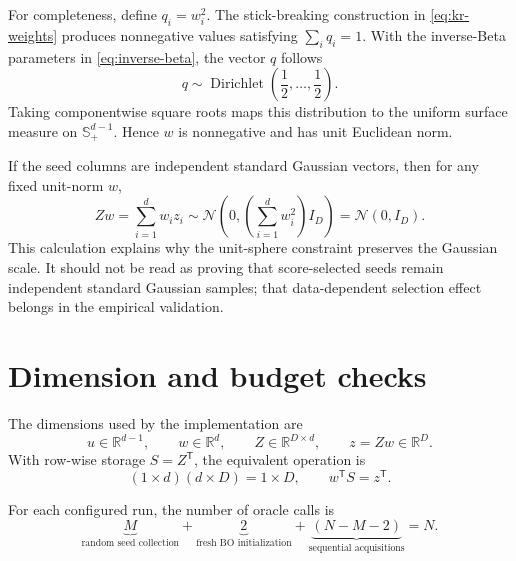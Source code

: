 \documentclass[11pt]{article}
\newcommand{\R}{\mathbb{R}}
\newcommand{\sphere}{\mathbb{S}}
\begin{document}
For completeness, define \(q_i=w_i^2\).  The stick-breaking construction in
\eqref{eq:kr-weights} produces nonnegative values satisfying
\(\sum_iq_i=1\).  With the inverse-Beta parameters in
\eqref{eq:inverse-beta}, the vector \(q\) follows
\begin{equation}
    q\sim\operatorname{Dirichlet}\!\left(\frac12,\ldots,\frac12\right).
    \label{eq:dirichlet-squared-weights}
\end{equation}
Taking componentwise square roots maps this distribution to the uniform
surface measure on \(\sphere^{d-1}_{+}\).  Hence \(w\) is nonnegative and has
unit Euclidean norm.

If the seed columns are independent standard Gaussian vectors, then for any
fixed unit-norm \(w\),
\begin{equation}
    Zw=\sum_{i=1}^{d}w_i z_i
    \sim\mathcal{N}\!\left(0,\left(\sum_{i=1}^{d}w_i^2\right)I_D\right)
    =\mathcal{N}(0,I_D).
    \label{eq:distribution-preservation}
\end{equation}
This calculation explains why the unit-sphere constraint preserves the
Gaussian scale.  It should not be read as proving that score-selected seeds
remain independent standard Gaussian samples; that data-dependent selection
effect belongs in the empirical validation.

\section{Dimension and budget checks}
\label{app:checks}

The dimensions used by the implementation are
\begin{equation}
    u\in\R^{d-1},
    \qquad w\in\R^d,
    \qquad Z\in\R^{D\times d},
    \qquad z=Zw\in\R^D.
    \label{eq:dimension-check}
\end{equation}
With row-wise storage \(S=Z^{\mathsf T}\), the equivalent operation is
\begin{equation}
    (1\times d)(d\times D)=1\times D,
    \qquad w^{\mathsf T}S=z^{\mathsf T}.
    \label{eq:row-dimension-check}
\end{equation}

For each configured run, the number of oracle calls is
\begin{equation}
    \underbrace{M}_{\text{random seed collection}}
    +\underbrace{2}_{\text{fresh BO initialization}}
    +\underbrace{(N-M-2)}_{\text{sequential acquisitions}}
    =N.
    \label{eq:appendix-budget-check}
\end{equation}

\printbibliography
\end{document}
